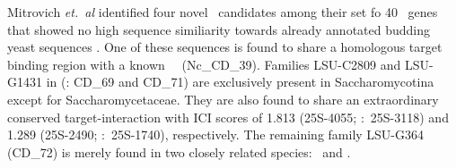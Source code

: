 %
%
%


Mitrovich \emph{et.~al} identified four novel \sno\ candidates among their set fo 40 \sno\ genes that showed no high sequence similiarity towards already annotated budding yeast sequences \cite{Mitrovich:2010}. One of these sequences is found to share a homologous target
binding region with a known \ncr\ \sno\ (Nc\_CD\_39). Families LSU-C2809 and LSU-G1431 in \cite{Mitrovich:2010} (\snostrip: CD\_69 and CD\_71)  are exclusively present in Saccharomycotina except for Saccharomycetaceae. They are also found to share an extraordinary conserved target-interaction with ICI scores of 1.813 (25S-4055; \calb:~25S-3118) and 1.289 (25S-2490; \calb:~25S-1740), respectively. The remaining family LSU-G364 (CD\_72) is merely found in two closely related species: \cdu\ and \ctr.



